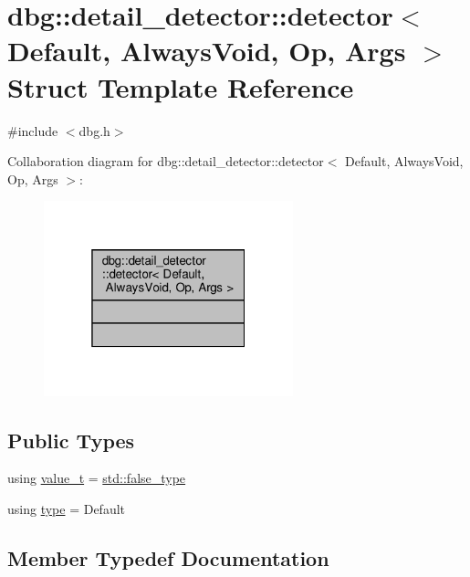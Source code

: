 \hypertarget{structdbg_1_1detail__detector_1_1detector}{}\section{dbg\+:\+:detail\+\_\+detector\+:\+:detector$<$ Default, Always\+Void, Op, Args $>$ Struct Template Reference}
\label{structdbg_1_1detail__detector_1_1detector}


{\ttfamily \#include $<$dbg.\+h$>$}



Collaboration diagram for dbg\+:\+:detail\+\_\+detector\+:\+:detector$<$ Default, Always\+Void, Op, Args $>$\+:\nopagebreak
\begin{figure}[H]
\begin{center}
\leavevmode
\includegraphics[width=205pt]{d8/d4f/structdbg_1_1detail__detector_1_1detector__coll__graph}
\end{center}
\end{figure}
\subsection*{Public Types}
\begin{DoxyCompactItemize}
\item 
using \hyperlink{structdbg_1_1detail__detector_1_1detector_af1b6da4282d723669e926c52f446a989}{value\+\_\+t} = \hyperlink{namespacestd_aebe6729ab5488ecc76c762873d226857}{std\+::false\+\_\+type}
\item 
using \hyperlink{structdbg_1_1detail__detector_1_1detector_aab6b446944545683b9533ea8fc623480}{type} = Default
\end{DoxyCompactItemize}


\subsection{Member Typedef Documentation}
\mbox{\label{structdbg_1_1detail__detector_1_1detector_aab6b446944545683b9533ea8fc623480}} 
